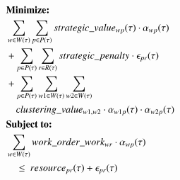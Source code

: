 \begin{alignat}{2}
	& \textbf{Minimize:} \notag                                                                                                                                                                                                                                                                                \\
	& \sum_{\ElementWorkOrder \in \SetWorkOrder{}} \sum_{\ElementPeriod \in \SetPeriod} \ParStrategicValue \cdot \VarStrategicWorkOrderAssignment{\ElementWorkOrder}{\ElementPeriod}                                                                                                                           \\ 
	& + \sum_{\ElementPeriod \in \SetPeriod} \sum_{\ElementResource \in \SetResource} \ParStrategicPenalty \cdot \VarStrategicExcess                                                                                                                                                                           \\
	& + \sum_{\ElementPeriod \in \SetPeriod} \sum_{\ElementWorkOrder1 \in \SetWorkOrder{}} \sum_{\ElementWorkOrder2 \in \SetWorkOrder{}} \notag                                                                                                                                                                \\ 
	& \quad \ParClusteringValue \cdot \VarStrategicWorkOrderAssignment{\ElementWorkOrder1}{\ElementPeriod} \cdot \VarStrategicWorkOrderAssignment{\ElementWorkOrder2}{\ElementPeriod}                                                                                 \label{eqn:objective_function_strategic} \\
	& \textbf{Subject to:} \notag                                                                                                                                                                                                                                                                              \\
	& \sum_{\ElementWorkOrder \in \SetWorkOrder{}} \ParStrategicWorkOrderWeight \cdot \VarStrategicWorkOrderAssignment{\ElementWorkOrder}{\ElementPeriod} \notag                                                                                                                                               \\ 
	& \quad \leq \ \ParStrategicResource + \VarStrategicExcess \notag                                                                                                                                                                                                                                          \\ 

\end{alignat}
